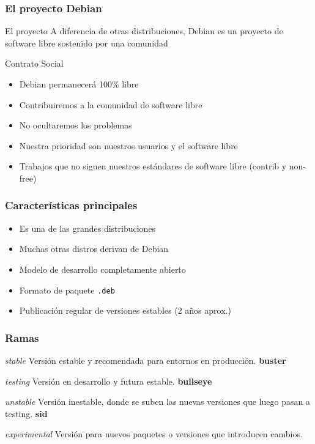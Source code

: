 \documentclass{beamer}
\author{Alberto Molina Coballes}
\title{\centering{\texttt{[image: img/openlogo-debian.png]}}}
\institute{IES Gonzalo Nazareno}
\date{\today}
\begin{document}
\begin{frame}[t,plain]
\titlepage
\end{frame}

\begin{frame} \frametitle{El proyecto Debian}
  \begin{block}{El proyecto}
    A diferencia de otras distribuciones, Debian es un proyecto de
    software libre sostenido por una comunidad
  \end{block}
  \begin{block}{Contrato Social}
    \begin{itemize}
    \item Debian permanecerá 100\% libre
    \item Contribuiremos a la comunidad de software libre
    \item No ocultaremos los problemas
    \item Nuestra prioridad son nuestros usuarios y el software libre
    \item Trabajos que no siguen nuestros estándares de software libre
      (contrib y non-free)
    \end{itemize}
  \end{block}
\end{frame}

\begin{frame}\frametitle{Características principales}
  \begin{itemize}
  \item Es una de las grandes distribuciones
  \item Muchas otras distros derivan de Debian
  \item Modelo de desarrollo completamente abierto
  \item Formato de paquete \texttt{.deb}
  \item Publicación regular de versiones estables (2 años aprox.)
  \end{itemize}
\end{frame}

\begin{frame}\frametitle{Ramas}
  \begin{block}{\textit{stable}}
    Versión estable y recomendada para entornos en producción. \textbf{buster}
  \end{block}
  \begin{block}{\textit{testing}}
    Versión en desarrollo y futura estable. \textbf{bullseye}
  \end{block}
  \begin{block}{\textit{unstable}}
    Versión inestable, donde se suben las nuevas versiones que luego pasan a testing. \textbf{sid}
  \end{block}
  \begin{block}{\textit{experimental}}
    Versión para nuevos paquetes o versiones que introducen cambios.
  \end{block}
\end{frame}
\end{document}

